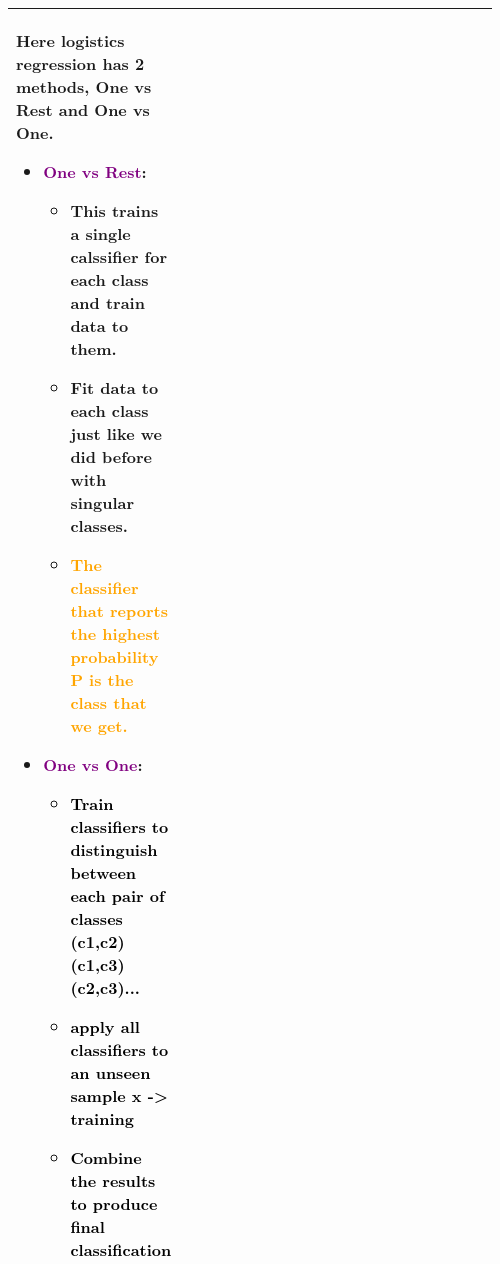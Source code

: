 \documentclass[main.tex,fontsize=8pt,paper=a4,paper=portrait,DIV=calc,]{scrartcl}
\begin{document}
\begin{table}[ht!]
\begin{tabular}{|m{0.2\linewidth}|m{0.755\linewidth}|}
Here logistics regression has 2 methods, \textbf{One vs Rest and One vs One}.\newline
\begin{itemize}
\item \textcolor{Purple}{One vs Rest}:\newline
\begin{itemize}
\item This trains a single calssifier for each class and train data to them.
\item Fit data to each class just like we did before with singular classes.
\item \textcolor{orange}{The classifier that reports the highest probability P is the class that we get.}
\end{itemize} 
\item \textcolor{Purple}{One vs One}:\newline
  \begin{itemize}
  \item \textcolor{black}{Train classifiers to distinguish between each pair of classes (c1,c2)(c1,c3)(c2,c3)...}
  \item \textcolor{black}{apply all classifiers to an unseen sample x -> training}
  \item \textcolor{black}{Combine the results to produce final classification}
  \end{itemize} 
\vspace{-3mm}
\end{itemize}\\ 
\hline
\end{tabular}
\end{table}
\pagebreak
\end{document}
